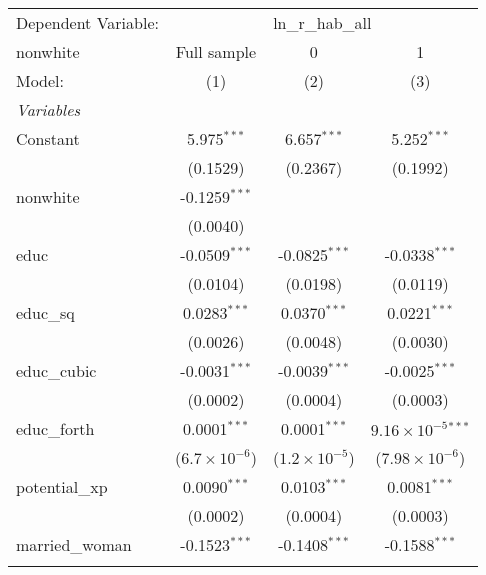 \begingroup
\centering
\begin{tabular}{lccc}
   \tabularnewline \midrule \midrule
   Dependent Variable: & \multicolumn{3}{c}{ln\_r\_hab\_all}\\
   nonwhite                        & Full sample            & 0                      & 1 \\   
   Model:                          & (1)                    & (2)                    & (3)\\  
   \midrule
   \emph{Variables}\\
   Constant                        & 5.975$^{***}$          & 6.657$^{***}$          & 5.252$^{***}$\\   
                                   & (0.1529)               & (0.2367)               & (0.1992)\\   
   nonwhite                        & -0.1259$^{***}$        &                        &   \\   
                                   & (0.0040)               &                        &   \\   
   educ                            & -0.0509$^{***}$        & -0.0825$^{***}$        & -0.0338$^{***}$\\   
                                   & (0.0104)               & (0.0198)               & (0.0119)\\   
   educ\_sq                        & 0.0283$^{***}$         & 0.0370$^{***}$         & 0.0221$^{***}$\\   
                                   & (0.0026)               & (0.0048)               & (0.0030)\\   
   educ\_cubic                     & -0.0031$^{***}$        & -0.0039$^{***}$        & -0.0025$^{***}$\\   
                                   & (0.0002)               & (0.0004)               & (0.0003)\\   
   educ\_forth                     & 0.0001$^{***}$         & 0.0001$^{***}$         & $9.16\times 10^{-5}$$^{***}$\\    
                                   & ($6.7\times 10^{-6}$)  & ($1.2\times 10^{-5}$)  & ($7.98\times 10^{-6}$)\\    
   potential\_xp                   & 0.0090$^{***}$         & 0.0103$^{***}$         & 0.0081$^{***}$\\   
                                   & (0.0002)               & (0.0004)               & (0.0003)\\   
   married\_woman                  & -0.1523$^{***}$        & -0.1408$^{***}$        & -0.1588$^{***}$\\   
$$
\end{tabular}
